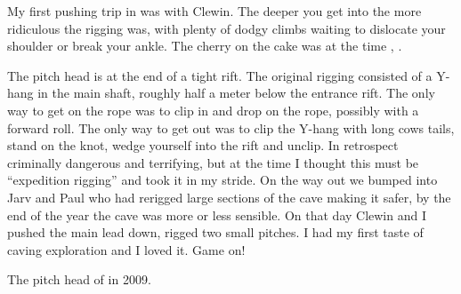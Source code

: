 

My first pushing trip in  was with Clewin. The
deeper you get into  the more ridiculous the
rigging was, with plenty of dodgy climbs waiting to dislocate your
shoulder or break your ankle. The cherry on the cake was at the time
, .

The pitch head is at the end of a tight rift. The original rigging
consisted of a Y-hang in the main shaft, roughly half a meter below the
entrance rift. The only way to get on the rope was to clip in and drop
on the rope, possibly with a forward roll. The only way to get out was
to clip the Y-hang with long cows tails, stand on the knot, wedge
yourself into the rift and unclip. In retrospect criminally dangerous
and terrifying, but at the time I thought this must be ``expedition
rigging'' and took it in my stride. On the way out we bumped into Jarv
and Paul who had rerigged large sections of the cave making it safer, by
the end of the year the cave was more or less sensible. On that day
Clewin and I pushed the main lead down, rigged two small pitches. I had
my first taste of caving exploration and I loved it. Game on!

\begin{marginfigure}
\checkoddpage \ifoddpage \forcerectofloat \else \forceversofloat \fi
\centering
 \caption{The pitch head of \protect{} in 2009. }
 \label{Kill em all wellies}
\end{marginfigure}

